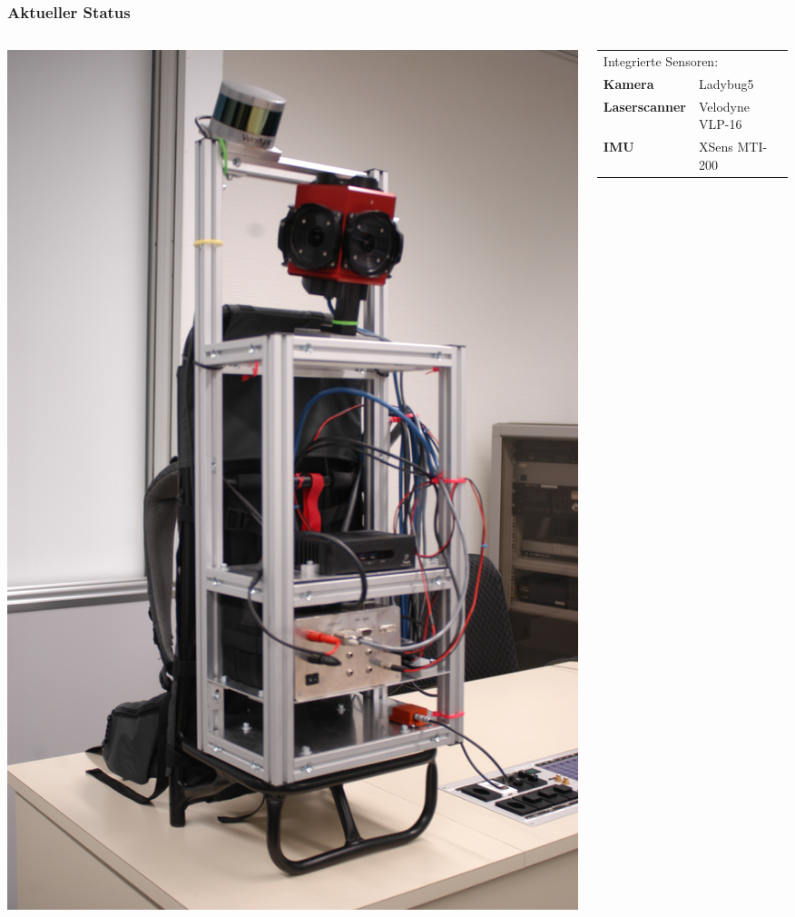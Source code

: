 \documentclass[aspectratio=169]{beamer}
\begin{document}
\begin{frame}
\frametitle{Aktueller Status}
  \begin{columns}[onlytextwidth]
    \begin{column}{0.33\textwidth}
      \includegraphics[height=0.7\textheight]{./Abbildungen/cappro_3.JPG}
    \end{column}
    \begin{column}{0.66\textwidth}
      \begin{tabular}{ll}
 	\multicolumn{2}{l}{Integrierte Sensoren:}\\
	\textbf{Kamera} & Ladybug5\\
	\textbf{Laserscanner} & Velodyne VLP-16\\
	\textbf{IMU} & XSens MTI-200\\

\end{tabular}
\end{column}
\end{columns}
\end{frame}
\end{document}
